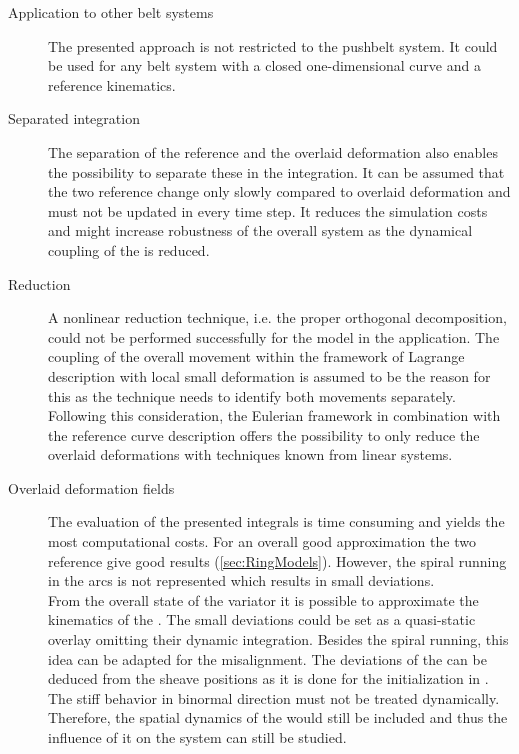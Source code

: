 \begin{description}
  \item[Application to other belt systems] The presented approach is not restricted to the pushbelt \CVT system. 
  It could be used for any belt system with a closed one-dimensional curve and a reference kinematics.
  \item[Separated integration] The separation of the reference and the overlaid deformation also enables the possibility to separate these \DOFs in the integration.
  It can be assumed that the two reference \DOFs change only slowly compared to overlaid deformation and must not be updated in every time step.
  It reduces the simulation costs and might increase robustness of the overall system as the dynamical coupling of the \DOFs is reduced.  
  \item[Reduction] A nonlinear reduction technique, i.e. the proper orthogonal decomposition, could not be performed successfully for the \LRVM model in the \CVT application. 
  The coupling of the overall movement within the framework of Lagrange description with local small deformation is assumed to be the reason for this as the technique needs to identify both movements separately.
  Following this consideration, the Eulerian framework in combination with the reference curve description offers the possibility to only reduce the overlaid deformations with techniques known from linear systems.
  \item[Overlaid deformation fields] The evaluation of the presented integrals is time consuming and yields the most computational costs.
  For an overall good approximation the two reference \DOFs give good results (\cref{sec:RingModels}). 
  However, the spiral running in the arcs is not represented which results in small deviations.\\
  From the overall state of the variator it is possible to approximate the kinematics of the \ring.
  The small deviations could be set as a quasi-static overlay omitting their dynamic integration.
  Besides the spiral running, this idea can be adapted for the misalignment.
  The deviations of the \rings can be deduced from the sheave positions as it is done for the initialization in \cite{schindler_spatial_2010}.
  The stiff behavior in binormal direction must not be treated dynamically.
  Therefore, the spatial dynamics of the \els would still be included and thus the influence of it on the system can still be studied.
\end{description}






